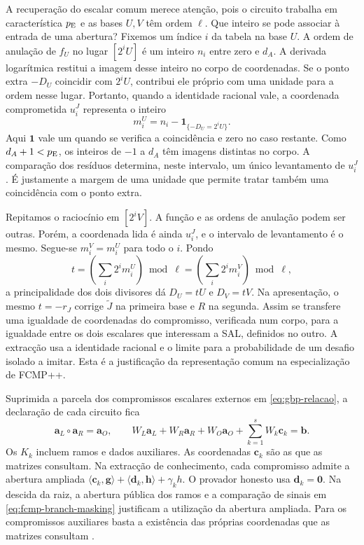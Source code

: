 A recuperação do escalar comum merece atenção, pois o circuito
trabalha em característica \(p_{\rm E}\) e as bases \(U,V\) têm
ordem \(\ell\). Que inteiro se pode associar à entrada de uma
abertura? Fixemos um índice \(i\) da tabela na base \(U\).
A ordem de anulação de \(f_U\) no lugar \([2^iU]\) é um inteiro
\(n_i\) entre zero e \(d_A\). A derivada logarítmica restitui
a imagem desse inteiro no corpo de coordenadas. Se o ponto extra
\(-D_U\) coincidir com \(2^iU\), contribui ele próprio com uma
unidade para a ordem nesse lugar. Portanto, quando a identidade
racional vale, a coordenada comprometida \(u_i^J\) representa o
inteiro
\[
       m_i^{U}=n_i-\boldsymbol 1_{\{-D_U=2^iU\}} .
\]
Aqui \(\boldsymbol 1\) vale um quando se verifica a coincidência
e zero no caso restante. Como \(d_A+1<p_{\rm E}\), os inteiros de
\(-1\) a \(d_A\) têm imagens distintas no corpo. A comparação
dos resíduos determina, neste intervalo, um único levantamento de
\(u_i^J\). É justamente a margem de uma unidade que permite
tratar também uma coincidência com o ponto extra.

Repitamos o raciocínio em \([2^iV]\). A função e as ordens de
anulação podem ser outras. Porém, a coordenada lida é ainda
\(u_i^J\), e o intervalo de levantamento é o mesmo. Segue-se
\(m_i^{V}=m_i^{U}\) para todo o \(i\). Pondo
\[
 t=\left(\sum_i2^i m_i^{U}\right)\bmod\ell
   =\left(\sum_i2^i m_i^{V}\right)\bmod\ell ,
\]
a principalidade dos dois divisores dá \(D_U=tU\) e \(D_V=tV\).
Na apresentação, o mesmo \(t=-r_J\) corrige
\(\widetilde J\) na primeira base e \(R\) na segunda. Assim se
transfere uma igualdade de coordenadas do compromisso, verificada
num corpo, para a igualdade entre os dois escalares que interessam
a SAL, definidos no outro. A extracção usa a identidade racional
e o limite para a probabilidade de um desafio isolado a imitar.
Esta é a justificação da representação comum na especialização de
FCMP++.

Suprimida a parcela dos compromissos escalares externos em
\eqref{eq:gbp-relacao}, a declaração de cada circuito fica
\begin{equation}
 \boldsymbol a_L\circ\boldsymbol a_R=\boldsymbol a_O,\qquad
 W_L\boldsymbol a_L+W_R\boldsymbol a_R+W_O\boldsymbol a_O
       +\sum_{k=1}^{s}W_k\boldsymbol c_k=\boldsymbol b .
 \label{eq:fcmp-gbp-linear}
\end{equation}
Os \(K_k\) incluem ramos e dados auxiliares. As coordenadas
\(\boldsymbol c_k\) são as que as matrizes consultam. Na
extracção de conhecimento, cada compromisso admite a abertura
ampliada \(\langle\boldsymbol c_k,\boldsymbol g\rangle+
\langle\boldsymbol d_k,\boldsymbol h\rangle+\gamma_kh\).
O provador honesto usa \(\boldsymbol d_k=\boldsymbol0\).
Na descida da raiz, a abertura pública dos ramos e a comparação
de sinais em \eqref{eq:fcmp-branch-masking} justificam a utilização da
abertura ampliada. Para os compromissos auxiliares basta a
existência das próprias coordenadas que as matrizes consultam
\cite{generalized-bulletproofs-fixed,monero-oxide-fcmp-source}.

